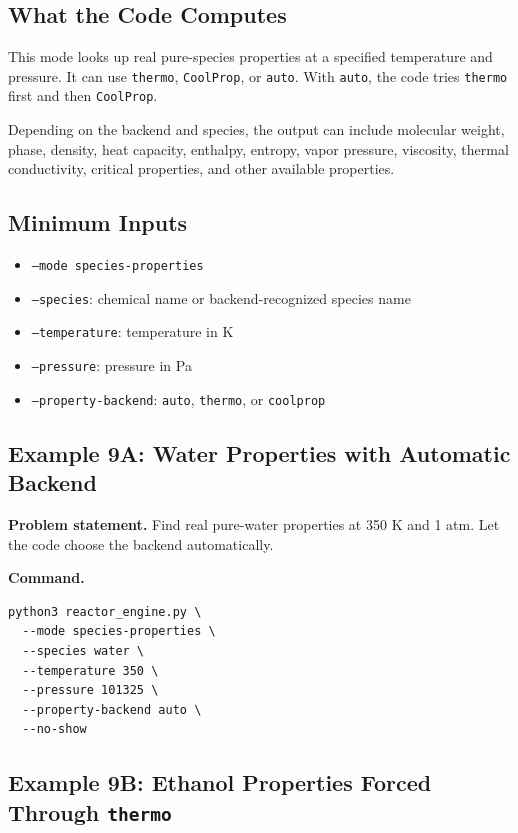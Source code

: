 \documentclass[11pt]{article}
\begin{document}
\subsection{What the Code Computes}

This mode looks up real pure-species properties at a specified temperature and pressure. It can use \texttt{thermo}, \texttt{CoolProp}, or \texttt{auto}. With \texttt{auto}, the code tries \texttt{thermo} first and then \texttt{CoolProp}.

Depending on the backend and species, the output can include molecular weight, phase, density, heat capacity, enthalpy, entropy, vapor pressure, viscosity, thermal conductivity, critical properties, and other available properties.

\subsection{Minimum Inputs}

\begin{itemize}
    \item \texttt{--mode species-properties}
    \item \texttt{--species}: chemical name or backend-recognized species name
    \item \texttt{--temperature}: temperature in K
    \item \texttt{--pressure}: pressure in Pa
    \item \texttt{--property-backend}: \texttt{auto}, \texttt{thermo}, or \texttt{coolprop}
\end{itemize}

\subsection{Example 9A: Water Properties with Automatic Backend}

\textbf{Problem statement.} Find real pure-water properties at 350 K and 1 atm. Let the code choose the backend automatically.

\textbf{Command.}

\begin{lstlisting}
python3 reactor_engine.py \
  --mode species-properties \
  --species water \
  --temperature 350 \
  --pressure 101325 \
  --property-backend auto \
  --no-show
\end{lstlisting}

\subsection{Example 9B: Ethanol Properties Forced Through \texttt{thermo}}
\end{document}
